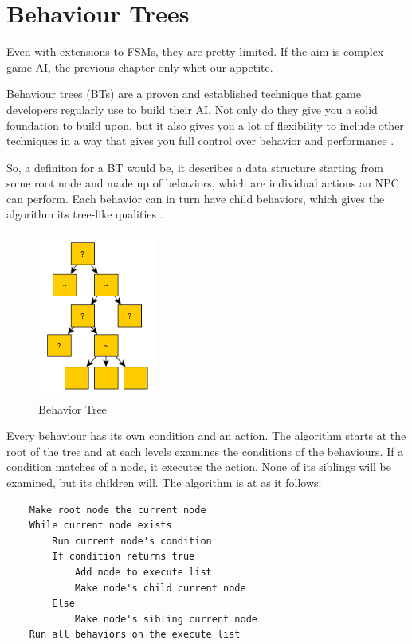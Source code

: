 \documentclass[a4paper, 12pt]{book}
\begin{document}
\section{Behaviour Trees}

Even with extensions to FSMs, they are pretty limited. If the aim is complex game AI, the previous chapter only whet our appetite.

Behaviour trees (BTs) are a proven and established technique that game developers regularly use to build their AI. Not only do they give you a solid foundation to build upon, but it also gives you a lot of flexibility to include other techniques in a way that gives you full control over behavior and performance \cite{BehaviourTreeStarterPack}.

So, a definiton for a BT would be, it describes a data structure starting from some root node and made up of behaviors, which are individual actions an NPC can perform. Each behavior can in turn have child behaviors, which gives the algorithm its tree-like qualities \cite{BehaviourSelectionAlgorithms}.

\begin{figure}[h]
\begin{center}
    \includegraphics[width=0.35\textwidth]{Images/behaviour_tree.png}
\end{center}
\caption{Behavior Tree}
\label{pic3}
\end{figure}

Every behaviour has its own condition and an action. The algorithm starts at the root of the tree and at each levels examines the conditions of the behaviours. If a condition matches of a node, it executes the action. None of its siblings will be examined, but its children will. The algorithm is at as it follows:
\begin{verbatim}
    Make root node the current node
    While current node exists
        Run current node's condition
        If condition returns true
            Add node to execute list
            Make node's child current node
        Else
            Make node's sibling current node
    Run all behaviors on the execute list
\end{verbatim}
\end{document}
